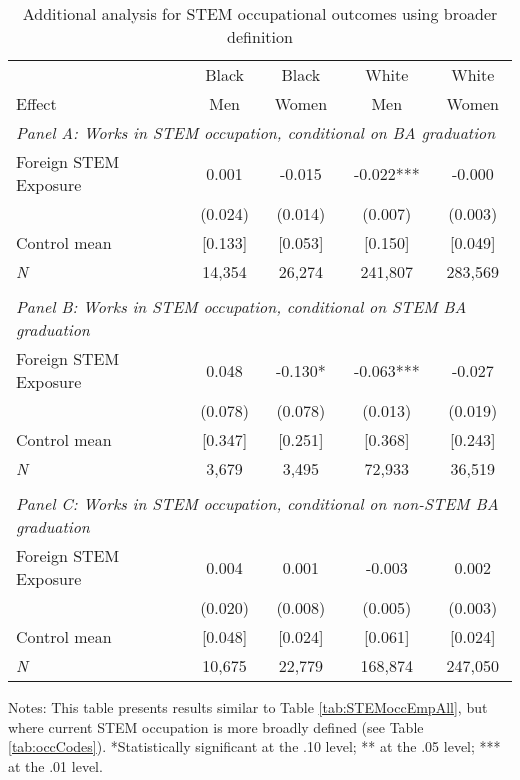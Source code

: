 \begin{table}[ht]
\caption{Additional analysis for STEM occupational outcomes using broader definition}
\label{tab:TA9}
\centering
\begin{threeparttable}
\begin{tabular}{lcccc}
\toprule 
       & Black           & Black        & White        & White       \\
Effect & Men             & Women        & Men          & Women       \\
\midrule 
\multicolumn{5}{l}{\emph{Panel A: Works in STEM occupation, conditional on BA graduation}}\\ 
Foreign STEM Exposure & 0.001  & -0.015  & -0.022*** & -0.000  \\ 
 &  (0.024) & (0.014) & (0.007) & (0.003) \\ 
Control mean &  [0.133] & [0.053] & [0.150]  & [0.049]\\ 
\emph{N} &     14,354 &    26,274 &   241,807 &   283,569 \\ 
&&&&\\
\multicolumn{5}{l}{\emph{Panel B: Works in STEM occupation, conditional on STEM BA graduation}}\\ 
Foreign STEM Exposure & 0.048  & -0.130* & -0.063*** & -0.027  \\ 
 &  (0.078) & (0.078) & (0.013) & (0.019) \\ 
Control mean &  [0.347] & [0.251] & [0.368]  & [0.243]\\ 
\emph{N} &      3,679 &     3,495 &    72,933 &    36,519 \\ 
&&&&\\
\multicolumn{5}{l}{\emph{Panel C: Works in STEM occupation, conditional on non-STEM BA graduation}}\\ 
Foreign STEM Exposure & 0.004  & 0.001  & -0.003  & 0.002  \\ 
 &  (0.020) & (0.008) & (0.005) & (0.003) \\ 
Control mean &  [0.048] & [0.024] & [0.061]  & [0.024]\\ 
\emph{N} &     10,675 &    22,779 &   168,874 &   247,050 \\ 
\bottomrule 
\end{tabular} 
\footnotesize Notes: This table presents results similar to Table \ref{tab:STEMoccEmpAll}, but where current STEM occupation is more broadly defined (see Table \ref{tab:occCodes}). *Statistically significant at the .10 level; ** at the .05 level; *** at the .01 level.
\end{threeparttable} 
\end{table} 
